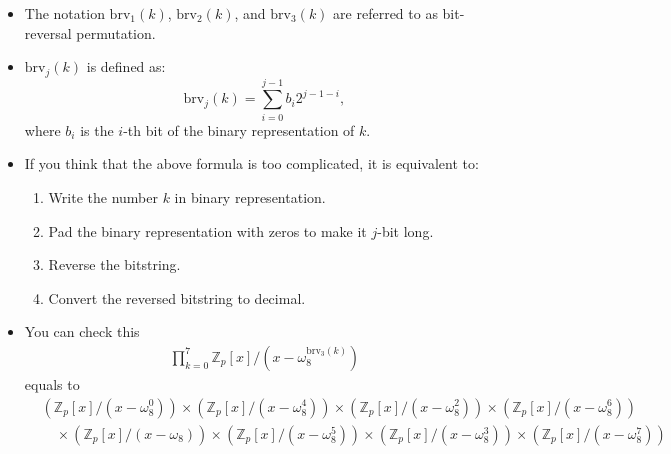\begin{frame}
    \begin{itemize}
        \item <1->The notation \( \mathrm{brv}_{1}(k) \), \( \mathrm{brv}_{2}(k) \), and \( \mathrm{brv}_{3}(k) \) are referred to as bit-reversal permutation.
        \item <2->\( \mathrm{brv}_{j}(k) \) is defined as:
            \[
                \mathrm{brv}_{j}(k) = \sum_{i=0}^{j-1} b_{i}2^{j-1-i},
            \]
            where \( b_{i} \) is the \( i \)-th bit of the binary representation of \( k \).

        \item <3->If you think that the above formula is too complicated, it is equivalent to:
        \begin{enumerate}
            \item Write the number \( k \) in binary representation.
            \item Pad the binary representation with zeros to make it \( j \)-bit long.
            \item Reverse the bitstring.
            \item Convert the reversed bitstring to decimal.
        \end{enumerate}

        \item <4->You can check this
        \begin{align*}
        \prod_{k=0}^{7} \mathbb{Z}_{p}[x]/(x-\omega_{8}^{\mathrm{brv}_{3}(k)})
        \end{align*}
        equals to
        \begin{align*}
        &(\mathbb{Z}_{p}[x]/(x-\omega_{8}^{0}))
        \times
        (\mathbb{Z}_{p}[x]/(x-\omega_{8}^{4}))
        \times
        (\mathbb{Z}_{p}[x]/(x-\omega_{8}^{2}))
        \times
        (\mathbb{Z}_{p}[x]/(x-\omega_{8}^{6})) \\[3pt]
  &\quad\times (\mathbb{Z}_{p}[x]/(x-\omega_{8}))
        \times
        (\mathbb{Z}_{p}[x]/(x-\omega_{8}^{5}))
        \times
        (\mathbb{Z}_{p}[x]/(x-\omega_{8}^{3}))
        \times
        (\mathbb{Z}_{p}[x]/(x-\omega_{8}^{7}))
        \end{align*}

    \end{itemize}
\end{frame}


